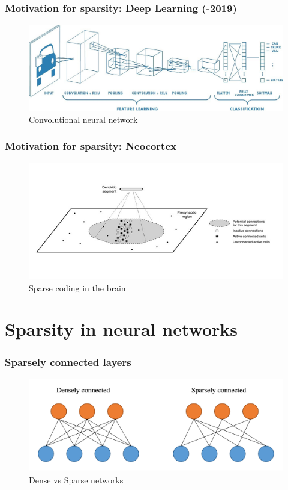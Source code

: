 \documentclass{beamer}
\begin{document}
  \begin{frame}
    \frametitle{Motivation for sparsity: Deep Learning (-2019)}
    \begin{figure}
        \centering
        \includegraphics[width=\textwidth]{images/cnn.jpeg}
        \caption{Convolutional neural network}
    \end{figure}
  \end{frame}
 
  \begin{frame}
    \frametitle{Motivation for sparsity: Neocortex}
    \begin{figure}
        \centering
        \includegraphics[width=\textwidth]{images/sparse-brain.png}
        \caption{Sparse coding in the brain}
    \end{figure}
  \end{frame}
  
  
  \section{Sparsity in neural networks}
  \begin{frame}
      \frametitle{Sparsely connected layers}
      \begin{figure}
        \centering
        \includegraphics[width=\textwidth]{images/sparse_vs_dense.png}
        \caption{Dense vs Sparse networks}
    \end{figure}
  \end{frame}
  
\end{document}
